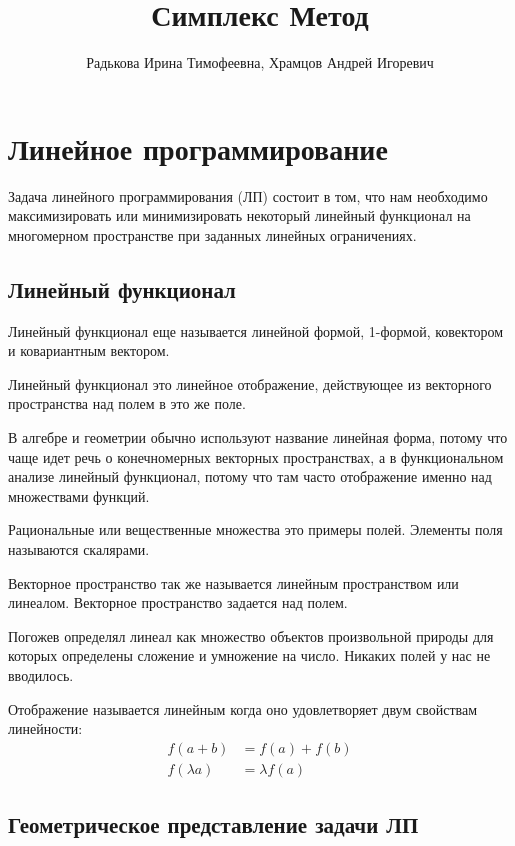 \documentclass[a4paper,article,14pt]{extarticle}
\title{Симплекс Метод}
\author{Радькова Ирина Тимофеевна, Храмцов Андрей Игоревич}
\begin{document}

\newpage
\tableofcontents
\newpage

\section{Линейное программирование}

Задача линейного программирования (ЛП) состоит в том, что нам необходимо максимизировать или минимизировать некоторый линейный функционал на многомерном пространстве при заданных линейных ограничениях.

\subsection{Линейный функционал}

Линейный функционал еще называется линейной формой, 1-формой, ковектором и ковариантным вектором.

Линейный функционал это линейное отображение, действующее из векторного пространства над полем в это же поле.

В алгебре и геометрии обычно используют название линейная форма, потому что чаще идет речь о конечномерных векторных пространствах, а в функциональном анализе линейный функционал, потому что там часто отображение именно над множествами функций.

Рациональные или вещественные множества это примеры полей.
Элементы поля называются скалярами.

Векторное пространство так же называется линейным пространством или линеалом.
Векторное пространство задается над полем.

Погожев определял линеал как множество объектов произвольной природы для которых определены сложение и умножение на число.
Никаких полей у нас не вводилось.

Отображение называется линейным когда оно удовлетворяет двум свойствам линейности:
\begin{equation}
    \begin{aligned}
        f(a + b) & = f(a) + f(b) \\
        f(\lambda a) & = \lambda f(a)
    \end{aligned}
\end{equation}

\subsection{Геометрическое представление задачи ЛП}
\end{document}
